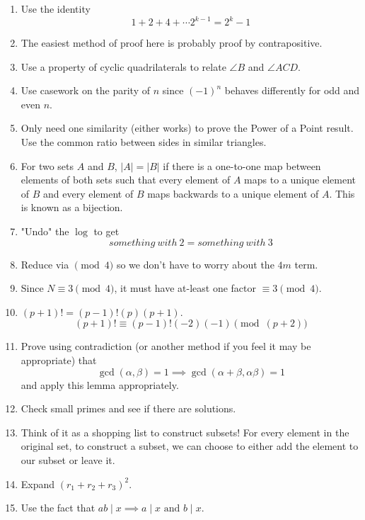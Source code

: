 \begin{enumerate}[label=\textbf{H\arabic*.}]
\begin{center}
    \end{center}
    $\angle AEC = \angle DEB$ and $\angle CEB = \angle DEA$. 
    \item Use the identity 
    \[
    1 + 2 + 4 + \cdots 2^{k-1} = 2^k-1
    \]
    \item The easiest method of proof here is probably proof by contrapositive.
    \item Use a property of cyclic quadrilaterals to relate $\angle B$ and $\angle ACD$.
    \item Use casework on the parity of $n$ since $(-1)^n$ behaves differently for odd and even $n$.
    \item Only need one similarity (either works) to prove the Power of a Point result. Use the common ratio between sides in similar triangles. 
    \item For two sets $A$ and $B$, $|A| = |B|$ if there is a one-to-one map between elements of both sets such that every element of $A$ maps to a unique element of $B$ and every element of $B$ maps backwards to a unique element of $A$. This is known as a bijection.
    \item "Undo" the $\log$ to get 
    \[something ~ with ~ 2 = something~ with ~ 3\]
    \item Reduce via $\pmod{4}$ so we don't have to worry about the $4m$ term. 
    \item Since $N \equiv 3 \pmod{4}$, it must have at-least one factor $\equiv 3 \pmod{4}$. 
    \item $(p+1)! = (p-1)! (p)(p+1) $. 
    \[
    (p+1)! \equiv (p-1)! (-2)(-1) \pmod{(p+2)}
    \]
    \item Prove using contradiction (or another method if you feel it may be appropriate) that
    \[
    \gcd(\alpha, \beta) = 1 \implies \gcd(\alpha + \beta, \alpha\beta) = 1
    \]
    and apply this lemma appropriately.
    \item Check small primes and see if there are solutions. 
    \item Think of it as a shopping list to construct subsets! For every element in the original set, to construct a subset, we can choose to either add the element to our subset or leave it. 
    \item Expand $(r_1 + r_2 + r_3)^2$.
    \item Use the fact that $ab \mid x \implies a \mid x \text{ and } b \mid x$.

\end{enumerate}
